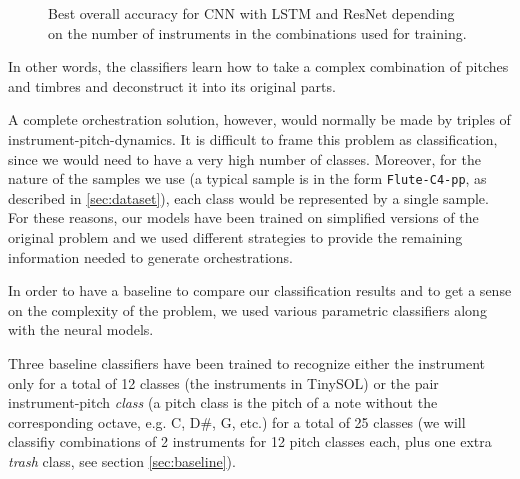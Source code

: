 \documentclass[runningheads,a4paper]{llncs}
\begin{document}
\begin{figure}
\caption{Best overall accuracy for CNN with LSTM and ResNet depending on the number of instruments in the combinations used for training. \label{cnn_vs_resnet}}
\end{figure}

In other words, the classifiers learn how to take a complex combination of pitches and timbres and deconstruct it into its original parts.

A complete orchestration solution, however, would normally be made by triples of instrument-pitch-dynamics. It is difficult to frame this problem as classification, since we would need to have a very high number of classes. Moreover, for the nature of the samples we use (a typical sample is in the form \texttt{Flute-C4-pp}, as described in \ref{sec:dataset}), each class would be represented by a single sample. For these reasons, our models have been trained on simplified versions of the original problem and we used different strategies to provide the remaining information needed to generate orchestrations.

In order to have a baseline to compare our classification results and to get a sense on the complexity of the problem, we used various parametric classifiers along with the neural models.

Three baseline classifiers have been trained to recognize either the instrument only for a total of 12 classes (the instruments in TinySOL) or the pair instrument-pitch \emph{class} (a pitch class is the pitch of a note without the corresponding octave, e.g. C, D\#, G, etc.) for a total of 25 classes (we will classifiy combinations of 2 instruments for 12 pitch classes each, plus one extra \emph{trash} class, see section \ref{sec:baseline}).
\end{document}
